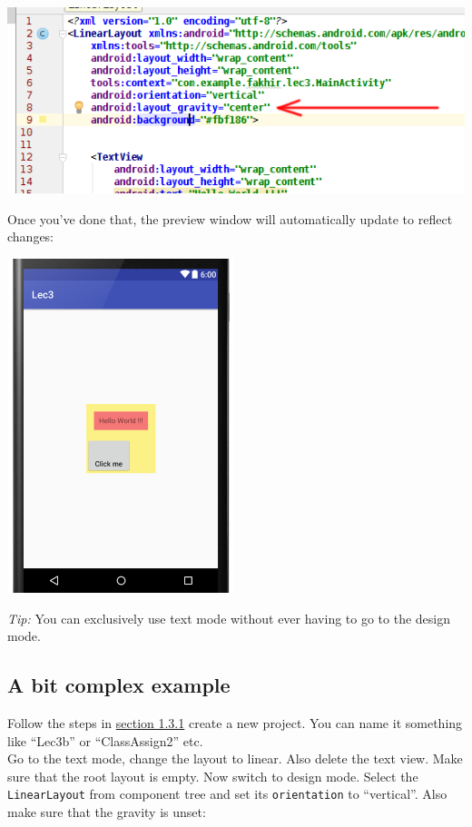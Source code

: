 \begin{center}
	\includegraphics[scale=0.4]{chapters/ch03/images/18_ll_grav}
\end{center}

Once you've done that, the preview window will automatically update to reflect changes:

\begin{center}
	\includegraphics[scale=0.3]{chapters/ch03/images/19_output}
\end{center}

\textit{Tip:} You can exclusively use text mode without ever having to go to the design mode.

\subsection{A bit complex example}
Follow the steps in \hyperref[sec:createProj]{section 1.3.1} create a new project. You can name it something like ``Lec3b'' or ``ClassAssign2'' etc. \\

Go to the text mode, change the layout to linear. Also delete the text view. Make sure that the root layout is empty. Now switch to design mode. Select the \texttt{LinearLayout} from component tree and set its \texttt{orientation} to ``vertical''. Also make sure
that the gravity is unset:

